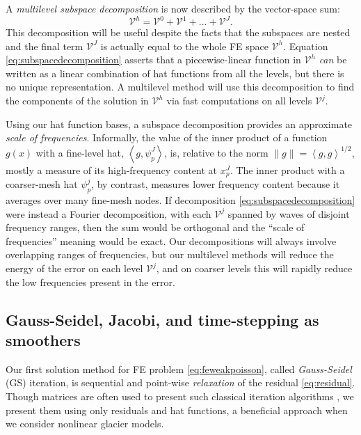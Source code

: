 \documentclass[letterpaper,final,12pt,reqno]{amsart}
\theoremstyle{claim}
\newcommand{\ip}[2]{\left<#1,#2\right>}
\numberwithin{equation}{section}
\numberwithin{figure}{section}
\numberwithin{table}{section}
\numberwithin{theorem}{section}
\begin{document}
A \emph{multilevel subspace decomposition} is now described by the vector-space sum:
\begin{equation}
  \mathcal{V}^h = \mathcal{V}^0 + \mathcal{V}^1 + \dots + \mathcal{V}^J. \label{eq:subspacedecomposition}
\end{equation}
This decomposition will be useful despite the facts that the subspaces are nested and the final term $\mathcal{V}^J$ is actually equal to the whole FE space $\mathcal{V}^h$.  Equation \eqref{eq:subspacedecomposition} asserts that a piecewise-linear function in $\mathcal{V}^h$ \emph{can} be written as a linear combination of hat functions from all the levels, but there is no unique representation.  A multilevel method will use this decomposition to find the components of the solution in $\mathcal{V}^h$ via fast computations on all levels $\mathcal{V}^j$.

Using our hat function bases, a subspace decomposition provides an approximate \emph{scale of frequencies}.  Informally, the value of the inner product of a function $g(x)$ with a fine-level hat, $\ip{g}{\psi_p^J}$, is, relative to the norm $\|g\| = \ip{g}{g}^{1/2}$, mostly a measure of its high-frequency content at $x_p^J$.  The inner product with a coarser-mesh hat $\psi_p^j$, by contrast, measures lower frequency content because it averages over many fine-mesh nodes.  If decomposition \eqref{eq:subspacedecomposition} were instead a Fourier decomposition, with each $\mathcal{V}^j$ spanned by waves of disjoint frequency ranges, then the sum would be orthogonal and the ``scale of frequencies'' meaning would be exact.  Our decompositions will always involve overlapping ranges of frequencies, but our multilevel methods will reduce the energy of the error on each level $\mathcal{V}^j$, and on coarser levels this will rapidly reduce the low frequencies present in the error.

\subsection*{Gauss-Seidel, Jacobi, and time-stepping as smoothers}  Our first solution method for FE problem \eqref{eq:feweakpoisson}, called \emph{Gauss-Seidel} (GS) iteration, is sequential and point-wise \emph{relaxation} of the residual \eqref{eq:residual}.  Though matrices are often used to present such classical iteration algorithms \cite[for example]{Bueler2021,Greenbaum1997}, we present them using only residuals and hat functions, a beneficial approach when we consider nonlinear glacier models.
\end{document}

